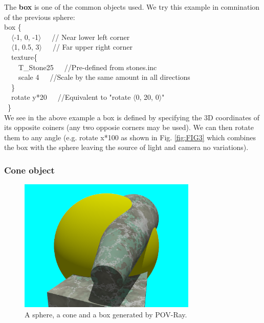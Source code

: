 \documentclass[fleqn,10pt]{wlscirep}
\newcommand*{\PV}{POV-Ray}
\begin{document}
The \textbf{box} is one of the common objects used. We try this example in comnination of the previous sphere:\\
\textcolor[rgb]{0.2,0.1,1}{box \{} \\
\textcolor[rgb]{0.2,0.1,1}{\ \ $\langle$-1, 0, -1$\rangle$}\ \ \ // Near lower left corner \\
\textcolor[rgb]{0.2,0.1,1}{\ \ $\langle$1, 0.5, 3$\rangle$}\ \ \ // Far upper right corner \\
\textcolor[rgb]{0.2,0.1,1}{\ \ texture\{} \\
\textcolor[rgb]{0.2,0.1,1}{\ \ \ \ T\_Stone25}\ \ \ //Pre-defined from stones.inc \\
\textcolor[rgb]{0.2,0.1,1}{\ \ \ \ scale 4}\ \ \ //Scale by the same amount in all directions \\
\textcolor[rgb]{0.2,0.1,1}{\ \ \}} \\
\textcolor[rgb]{0.2,0.1,1}{\ \ rotate y*20}\ \ \ //Equivalent to "rotate $\langle$0, 20, 0$\rangle$" \\
\textcolor[rgb]{0.2,0.1,1}{\ \}} \\



We see in the above example a box is defined by specifying the 3D coordinates of its opposite coiners (any two opposie corners may be used). We can then rotate them to any angle (e.g. rotate x*100 as shown in Fig. \ref{fig:FIG3} which combines the box with the sphere leaving the source of light and camera no variations).\\
\subsubsection{Cone object}

\begin{figure}[htbp]
\centering
\includegraphics[width=20pc,clip]{FIG4}
\caption{A sphere, a cone and a box generated by \PV.}
\label{fig:FIG4}
\end{figure}
\end{document}
